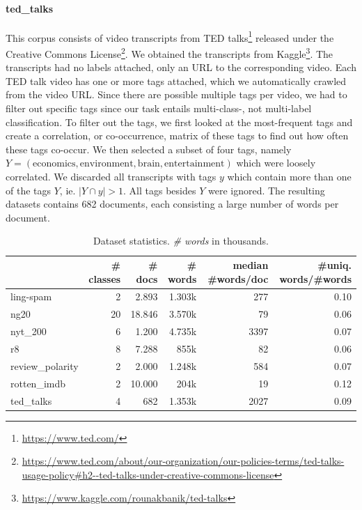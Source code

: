 \paragraph{ted\_talks}
This corpus consists of video transcripts from TED talks\footnote{\url{https://www.ted.com/}} released under the Creative Commons License\footnote{\url{https://www.ted.com/about/our-organization/our-policies-terms/ted-talks-usage-policy\#h2--ted-talks-under-creative-commons-license}}.
We obtained the transcripts from Kaggle\footnote{\url{https://www.kaggle.com/rounakbanik/ted-talks}}.
The transcripts had no labels attached, only an URL to the corresponding video.
Each TED talk video has one or more tags attached, which we automatically crawled from the video URL.
Since there are possible multiple tags per video, we had to filter out specific tags since our task entails multi-class-, not multi-label classification.
To filter out the tags, we first looked at the most-frequent tags and create a correlation, or co-occurrence, matrix of these tags to find out how often these tags co-occur.
We then selected a subset of four tags, namely $Y = (\mathrm{economics, environment, brain, entertainment})$  which were loosely correlated.
We discarded all transcripts with tags $y$ which contain more than one of the tags $Y$, ie. $|Y \cap y| > 1$.
All tags besides $Y$ were ignored.
The resulting datasets contains 682 documents, each consisting a large number of words per document.

\begin{table}[htb!]
\centering
\begin{tabular}{lrrrrr}
\toprule
{} &  \# classes &  \# docs & \# words & median \#words/doc &  \#uniq. words/\#words \\
\midrule
ling-spam       & 2 &  2.893 &  1.303k & 277 & 0.10 \\
ng20            & 20 &  18.846 &  3.570k & 79 & 0.06 \\
nyt\_200         & 6 &  1.200 &  4.735k & 3397 & 0.07 \\
r8              & 8 &  7.288 &  855k & 82 & 0.06 \\
review\_polarity & 2 &  2.000 &  1.248k & 584 & 0.07 \\
rotten\_imdb     & 2 &  10.000 &  204k & 19 & 0.12 \\
ted\_talks       & 4 &  682 &  1.353k & 2027 & 0.09 \\
\bottomrule
\end{tabular}
\caption[Statistics: Datasets]{Dataset statistics. \textit{\# words} in thousands.}\label{table:dataset_statistics}
\end{table}

